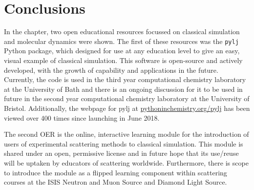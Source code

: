 \section{Conclusions}
In the chapter, two open educational resources focussed on classical simulation and molecular dynamics were shown.
The first of these resources was the \texttt{pylj} Python package, which designed for use at any education level to give an easy, visual example of classical simulation.
This software is open-source and actively developed, with the growth of capability and applications in the future.
Currently, the code is used in the third year computational chemistry laboratory at the University of Bath and there is an ongoing discussion for it to be used in future in the second year computational chemistry laboratory at the University of Bristol.
Additionally, the webpage for pylj at \href{https://pythoninchemistry.org/pylj}{pythoninchemistry.org/pylj} has been viewed over 400 times since launching in June 2018.

The second OER is the online, interactive learning module for the introduction of users of experimental scattering methods to classical simulation.
This module is shared under an open, permissive license and in future hope that its use/reuse will be uptaken by educators of scattering worldwide.
Furthermore, there is scope to introduce the module as a flipped learning component \cite{noauthor_flipped_nodate} within scattering courses at the ISIS Neutron and Muon Source and Diamond Light Source.
